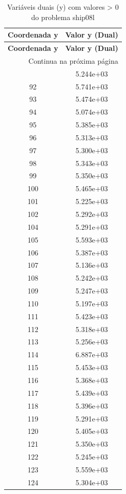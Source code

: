 \documentclass[12pt]{article}
\begin{document}
\begin{longtable}{@{}cc@{}}
\caption{Variáveis duais (y) com valores > 0 do problema ship08l} \\
\toprule
\textbf{Coordenada y} & \textbf{Valor y (Dual)} \\
\midrule
\endfirsthead

\toprule
\textbf{Coordenada y} & \textbf{Valor y (Dual)} \\
\midrule
\endhead

\midrule \multicolumn{2}{r}{{Continua na próxima página}} \\ \midrule
\endfoot

\bottomrule
\endlastfoot
91 & 5.244e+03 \\
92 & 5.741e+03 \\
93 & 5.474e+03 \\
94 & 5.074e+03 \\
95 & 5.385e+03 \\
96 & 5.313e+03 \\
97 & 5.300e+03 \\
98 & 5.343e+03 \\
99 & 5.350e+03 \\
100 & 5.465e+03 \\
101 & 5.225e+03 \\
102 & 5.292e+03 \\
104 & 5.291e+03 \\
105 & 5.593e+03 \\
106 & 5.387e+03 \\
107 & 5.136e+03 \\
108 & 5.242e+03 \\
109 & 5.247e+03 \\
110 & 5.197e+03 \\
111 & 5.423e+03 \\
112 & 5.318e+03 \\
113 & 5.256e+03 \\
114 & 6.887e+03 \\
115 & 5.453e+03 \\
116 & 5.368e+03 \\
117 & 5.439e+03 \\
118 & 5.396e+03 \\
119 & 5.291e+03 \\
120 & 5.405e+03 \\
121 & 5.350e+03 \\
122 & 5.245e+03 \\
123 & 5.559e+03 \\
124 & 5.304e+03 \\

\end{longtable}
\end{document}
